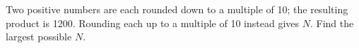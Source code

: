 Two positive numbers are each rounded down to a multiple of 10; the resulting product is 1200. Rounding each up to a multiple of 10 instead gives $N$. Find the largest possible $N$.
